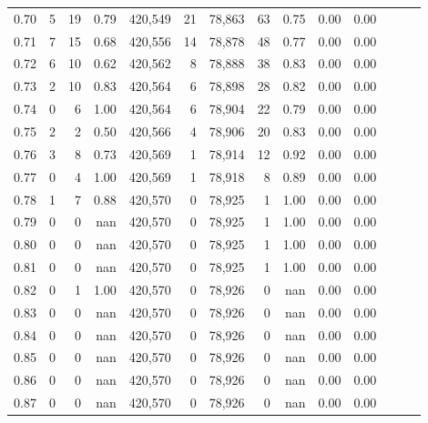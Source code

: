 \begin{tabular}{rrrrrrrrrrrrrr}
0.70 &       5 &     19 &  0.79 &  420,549 &       21 &  78,863 &      63 &  0.75 &  0.00 &      0.00 \\
0.71 &       7 &     15 &  0.68 &  420,556 &       14 &  78,878 &      48 &  0.77 &  0.00 &      0.00 \\
0.72 &       6 &     10 &  0.62 &  420,562 &        8 &  78,888 &      38 &  0.83 &  0.00 &      0.00 \\
0.73 &       2 &     10 &  0.83 &  420,564 &        6 &  78,898 &      28 &  0.82 &  0.00 &      0.00 \\
0.74 &       0 &      6 &  1.00 &  420,564 &        6 &  78,904 &      22 &  0.79 &  0.00 &      0.00 \\
0.75 &       2 &      2 &  0.50 &  420,566 &        4 &  78,906 &      20 &  0.83 &  0.00 &      0.00 \\
0.76 &       3 &      8 &  0.73 &  420,569 &        1 &  78,914 &      12 &  0.92 &  0.00 &      0.00 \\
0.77 &       0 &      4 &  1.00 &  420,569 &        1 &  78,918 &       8 &  0.89 &  0.00 &      0.00 \\
0.78 &       1 &      7 &  0.88 &  420,570 &        0 &  78,925 &       1 &  1.00 &  0.00 &      0.00 \\
0.79 &       0 &      0 &   nan &  420,570 &        0 &  78,925 &       1 &  1.00 &  0.00 &      0.00 \\
0.80 &       0 &      0 &   nan &  420,570 &        0 &  78,925 &       1 &  1.00 &  0.00 &      0.00 \\
0.81 &       0 &      0 &   nan &  420,570 &        0 &  78,925 &       1 &  1.00 &  0.00 &      0.00 \\
0.82 &       0 &      1 &  1.00 &  420,570 &        0 &  78,926 &       0 &   nan &  0.00 &      0.00 \\
0.83 &       0 &      0 &   nan &  420,570 &        0 &  78,926 &       0 &   nan &  0.00 &      0.00 \\
0.84 &       0 &      0 &   nan &  420,570 &        0 &  78,926 &       0 &   nan &  0.00 &      0.00 \\
0.85 &       0 &      0 &   nan &  420,570 &        0 &  78,926 &       0 &   nan &  0.00 &      0.00 \\
0.86 &       0 &      0 &   nan &  420,570 &        0 &  78,926 &       0 &   nan &  0.00 &      0.00 \\
0.87 &       0 &      0 &   nan &  420,570 &        0 &  78,926 &       0 &   nan &  0.00 &      0.00 \\

\end{tabular}
